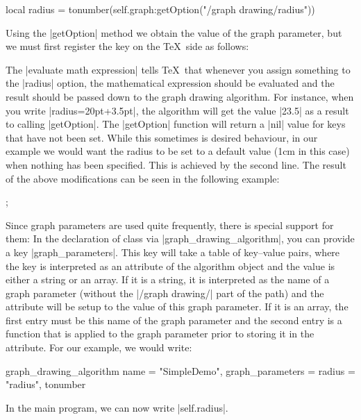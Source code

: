 \begin{codeexample}
local radius = tonumber(self.graph:getOption("/graph drawing/radius"))
\end{codeexample}

Using the |getOption| method we obtain the value of the
graph parameter, but we must first register the key on the \TeX\ side
as follows: 

\begin{codeexample}
\end{codeexample}

The |evaluate math expression| tells \TeX\ that whenever you assign
something to the |radius| option, the mathematical expression should
be evaluated and the result should be passed down to the graph drawing
algorithm. For instance, when you write |radius=20pt+3.5pt|, the
algorithm will get the value |23.5| as a result to calling
|getOption|. The |getOption| function will return a |nil| value for
keys that have not been set. While this sometimes is desired
behaviour, in our example we would want the radius to be set to a
default value (1cm in this case) when nothing has been specified. This
is achieved by the second line. The result of the above modifications
can be seen in the following example:

\begin{codeexample}[]
\tikz {};
\end{codeexample}

Since graph parameters are used quite frequently, there is special
support for them: In the declaration of class via
|graph_drawing_algorithm|, you can provide a key
|graph_parameters|. This key will take a table of key--value pairs,
where the key is interpreted as an attribute of the algorithm object
and the value is either a string or an array. If it is a string, it is
interpreted as the name of a graph parameter (without the
|/graph drawing/| part of the path) and the attribute will be setup to
the value of this graph parameter. If it is an array, the first entry
must be this name of the graph parameter and the second entry is a
function that is applied to the graph parameter prior to storing it in
the attribute. For our example, we would write:

\begin{codeexample}
graph_drawing_algorithm {
  name = "SimpleDemo",
  graph_parameters = {
    radius = { "radius", tonumber }
  }
}
\end{codeexample}
In the main program, we can now write |self.radius|.

